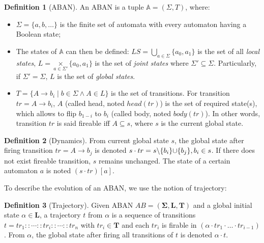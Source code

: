 \documentclass{article}
\theoremstyle{definition}
\newtheorem{definition}{Definition}
\DeclarePairedDelimiter{\addset}{\cup\{}{\}}
\DeclarePairedDelimiter{\miset}{\setminus\{}{\}}
\begin{document}
\begin{definition}[ABAN]\label{def:ABAN}
An ABAN is a tuple $\mathbb{A} = (\Sigma,T)$, where:
\begin{itemize}
\item $\Sigma=\{a,b,\ldots\}$ is the finite set of automata with every automaton having a Boolean state;
\item The states of $\mathbb{A}$ can then be defined: $LS= \underset{a\in \Sigma}{\bigcup} \{a_0,a_1\}$ is the set of all \textit{local states}, $L= \underset{a\in \Sigma'}{\times} \{a_0,a_1\}$ is the set of \textit{joint states} where $\Sigma'\subseteq\Sigma$. Particularly, if $\Sigma'=\Sigma$, $L$ is the set of \textit{global states}. 
\item $T= \{A\rightarrow b_i\mid b\in \Sigma \land A\in L\}$ is the set of transitions.
For transition $tr=A\to b_i$, $A$ (called head, noted $head(tr)$) is the set of required state(s), which allows to flip $b_{1-i}$ to $b_i$ (called body, noted $body(tr)$). In other words, transition $tr$ is said fireable iff $A\subseteq s$, where $s$ is the current global state. 
\end{itemize}
\end{definition}

\begin{definition}[Dynamics]\label{def:ABANdynamics}
    From current global state $s$, the global state after firing transition $tr=A\to b_j$ is denoted $s \cdot tr = s \miset{b_i} \addset {b_j}, b_i \in s$.
    If there does not exist fireable transition, $s$ remains unchanged.
    The state of a certain automaton $a$ is noted $(s\cdot tr)[a]$.
\end{definition}
To describe the evolution of an ABAN, we use the notion of trajectory:
\begin{definition}[Trajectory]
Given ABAN $AB = (\mathbf{\Sigma},\mathbf{L},\mathbf{T})$ and a global initial state $\alpha\in \mathbf{L}$, a trajectory $t$ from $\alpha$ is a sequence of transitions $t=tr_1::\cdots :: tr_i::\cdots ::tr_n$ with $tr_i\in\mathbf{T}$ and each $tr_i$ is firable in $(\alpha \cdot tr_1 \cdot \ldots \cdot tr_{i-1})$.
From $\alpha$, the global state after firing all transitions of $t$ is denoted $\alpha \cdot t$.
\end{definition}
\end{document}
